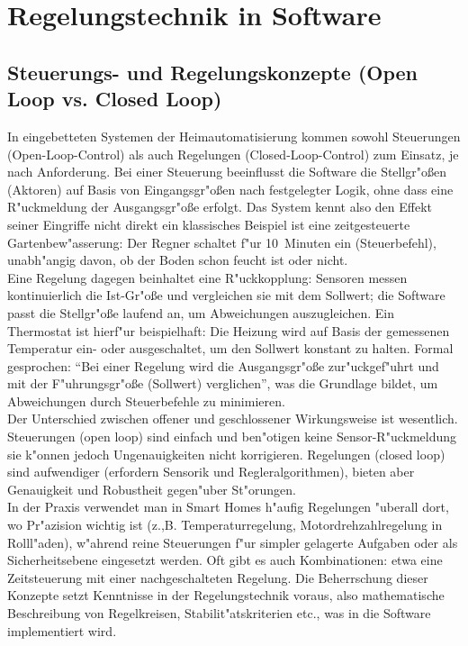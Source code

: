 \section{Regelungstechnik in Software}

\subsection*{Steuerungs- und Regelungskonzepte (Open Loop vs. Closed Loop)}
In eingebetteten Systemen der Heimautomatisierung kommen sowohl Steuerungen (Open-Loop-Control) als auch Regelungen (Closed-Loop-Control) zum Einsatz, je nach Anforderung. Bei einer Steuerung beeinflusst die Software die Stellgr"o\ss en (Aktoren) auf Basis von Eingangsgr"o\ss en nach festgelegter Logik, ohne dass eine R"uckmeldung der Ausgangsgr"o\ss e erfolgt. \autocite{moocit} Das System kennt also den Effekt seiner Eingriffe nicht direkt \textendash{} ein klassisches Beispiel ist eine zeitgesteuerte Gartenbew"asserung: Der Regner schaltet f"ur 10~Minuten ein (Steuerbefehl), unabh"angig davon, ob der Boden schon feucht ist oder nicht.
\\
Eine Regelung dagegen beinhaltet eine R"uckkopplung: Sensoren messen kontinuierlich die Ist-Gr"o\ss e und vergleichen sie mit dem Sollwert; die Software passt die Stellgr"o\ss e laufend an, um Abweichungen auszugleichen. \autocite{haustechnik} Ein Thermostat ist hierf"ur beispielhaft: Die Heizung wird auf Basis der gemessenen Temperatur ein- oder ausgeschaltet, um den Sollwert konstant zu halten. Formal gesprochen: \enquote{Bei einer Regelung wird die Ausgangsgr"o\ss e zur"uckgef"uhrt und mit der F"uhrungsgr"o\ss e (Sollwert) verglichen}, was die Grundlage bildet, um Abweichungen durch Steuerbefehle zu minimieren. \autocite{moocit}
\\
Der Unterschied zwischen offener und geschlossener Wirkungsweise ist wesentlich. Steuerungen (open loop) sind einfach und ben"otigen keine Sensor-R"uckmeldung \textendash{} sie k"onnen jedoch Ungenauigkeiten nicht korrigieren. Regelungen (closed loop) sind aufwendiger (erfordern Sensorik und Regleralgorithmen), bieten aber Genauigkeit und Robustheit gegen"uber St"orungen.
\\
In der Praxis verwendet man in Smart Homes h"aufig Regelungen "uberall dort, wo Pr"azision wichtig ist (z.,B. Temperaturregelung, Motordrehzahlregelung in Rolll"aden), w"ahrend reine Steuerungen f"ur simpler gelagerte Aufgaben oder als Sicherheitsebene eingesetzt werden. Oft gibt es auch Kombinationen: etwa eine Zeitsteuerung mit einer nachgeschalteten Regelung. Die Beherrschung dieser Konzepte setzt Kenntnisse in der Regelungstechnik voraus, also mathematische Beschreibung von Regelkreisen, Stabilit"atskriterien etc., was in die Software implementiert wird.
\\
